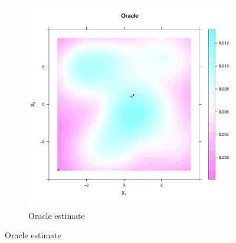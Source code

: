 \begin{figure}[htbp]
\begin{subfigure}[t]{0.45\textwidth}
    \includegraphics[width=\textwidth]{results/unif_100_unif/output/oracle_intensity_heatmap}
    \caption{Oracle estimate}
    \end{subfigure}



\end{figure}
